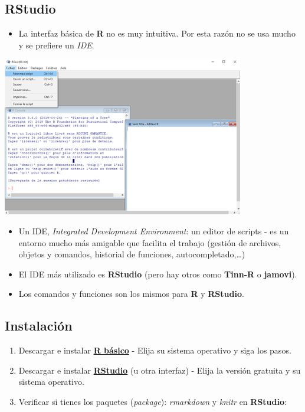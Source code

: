\documentclass[
]{article}
\providecommand{\tightlist}{%
  \setlength{\itemsep}{0pt}\setlength{\parskip}{0pt}}
\begin{document}
\hypertarget{rstudio}{%
\subsection{\texorpdfstring{\textbf{RStudio}}{RStudio}}\label{rstudio}}

\begin{itemize}
\tightlist
\item
  La interfaz básica de \textbf{R} no es muy intuitiva. Por esta razón
  no se usa mucho y se prefiere un \emph{IDE}.
\end{itemize}

\includegraphics{images/screenshotR.png}

\begin{itemize}
\tightlist
\item
  Un IDE, \emph{Integrated Development Environment}: un editor de
  scripts - es un entorno mucho más amigable que facilita el trabajo
  (gestión de archivos, objetos y comandos, historial de funciones,
  autocompletado,\ldots)
\item
  El IDE más utilizado es \textbf{RStudio} (pero hay otros como
  \textbf{Tinn-R} o \textbf{jamovi}).
\item
  Los comandos y funciones son los mismos para \textbf{R} y
  \textbf{RStudio}.
\end{itemize}

\hypertarget{instalaciuxf3n}{%
\subsection{Instalación}\label{instalaciuxf3n}}

\begin{enumerate}
\def\labelenumi{\arabic{enumi}.}
\item
  Descargar e instalar \href{https://cran.r-project.org/}{\textbf{R
  básico}} - Elija su sistema operativo y siga los pasos.
\item
  Descargar e instalar
  \href{https://www.rstudio.com/products/rstudio/download/\#download}{\textbf{RStudio}}
  (u otra interfaz) - Elija la versión gratuita y su sistema operativo.
\item
  Verificar si tienes los paquetes (\emph{package}): \emph{rmarkdown} y
  \emph{knitr} en \textbf{RStudio}:
\end{enumerate}
\end{document}
